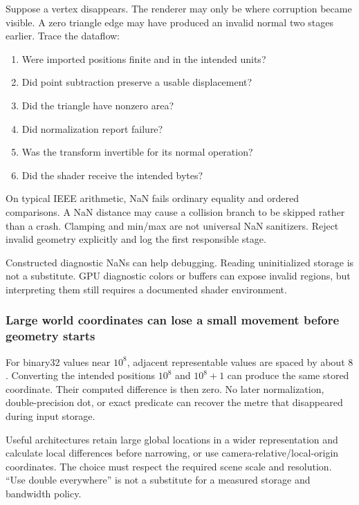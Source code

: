 Suppose a vertex disappears. The renderer may only be where corruption became visible. A zero triangle edge may have produced an invalid normal two stages earlier. Trace the dataflow:

\begin{enumerate}
\def\labelenumi{\arabic{enumi}.}
\tightlist
\item
  Were imported positions finite and in the intended units?
\item
  Did point subtraction preserve a usable displacement?
\item
  Did the triangle have nonzero area?
\item
  Did normalization report failure?
\item
  Was the transform invertible for its normal operation?
\item
  Did the shader receive the intended bytes?
\end{enumerate}

On typical IEEE arithmetic, NaN fails ordinary equality and ordered comparisons. A NaN distance may cause a collision branch to be skipped rather than a crash. Clamping and min/max are not universal NaN sanitizers. Reject invalid geometry explicitly and log the first responsible stage.

Constructed diagnostic NaNs can help debugging. Reading uninitialized storage is not a substitute. GPU diagnostic colors or buffers can expose invalid regions, but interpreting them still requires a documented shader environment.

\subsubsection{Large world coordinates can lose a small movement before geometry starts}\label{large-world-coordinates-can-lose-a-small-movement-before-geometry-starts}

For binary32 values near \(10^8\), adjacent representable values are spaced by about \(8\). Converting the intended positions \(10^8\) and \(10^8+1\) can produce the same stored coordinate. Their computed difference is then zero. No later normalization, double-precision dot, or exact predicate can recover the metre that disappeared during input storage.

Useful architectures retain large global locations in a wider representation and calculate local differences before narrowing, or use camera-relative/local-origin coordinates. The choice must respect the required scene scale and resolution. ``Use double everywhere'' is not a substitute for a measured storage and bandwidth policy.

